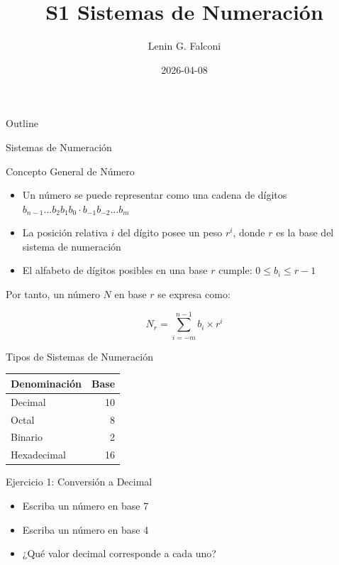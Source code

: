 \documentclass[presentation]{beamer}
\author{Lenin G. Falconi}
\date{2026-04-08}
\title{S1 Sistemas de Numeración}
\begin{document}
\maketitle
\begin{frame}{Outline}
\setcounter{tocdepth}{1}
\tableofcontents
\end{frame}


\begin{frame}[label={sec:org96615ff}]{Sistemas de Numeración}
\begin{block}{Concepto General de Número}
\begin{itemize}
\item Un número se puede representar como una cadena de dígitos
\(b_{n-1} \dots b_2b_1b_0 \cdot b_{-1}b_{-2}\dots b_m\)
\item La posición relativa \(i\) del dígito posee un \alert{peso} \(r^i\), donde \(r\)
es la \alert{base} del sistema de numeración
\item El alfabeto de dígitos posibles en una base \(r\) cumple:
\(0 \leq b_i \leq r-1\)
\end{itemize}

Por tanto, un número \(N\) en base \(r\) se expresa como:

$$N_r = \sum_{i=-m}^{n-1} b_i \times r^i$$
\end{block}

\begin{block}{Tipos de Sistemas de Numeración}
\begin{center}
\begin{tabular}{lr}
Denominación & Base\\[0pt]
\hline
Decimal & 10\\[0pt]
Octal & 8\\[0pt]
Binario & 2\\[0pt]
Hexadecimal & 16\\[0pt]
\end{tabular}
\end{center}
\end{block}

\begin{block}{Ejercicio 1: Conversión a Decimal}
\begin{itemize}
\item Escriba un número en base 7
\item Escriba un número en base 4
\item ¿Qué valor decimal corresponde a cada uno?
\end{itemize}
\end{block}
\end{frame}
\end{document}
